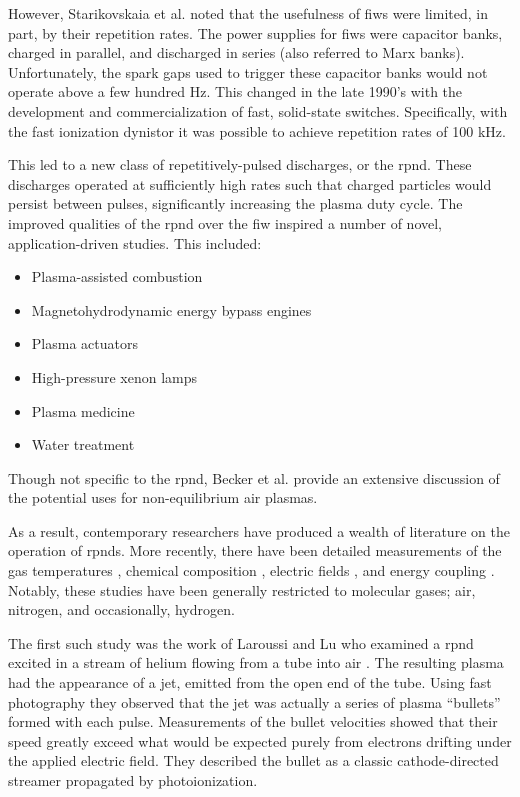 However, Starikovskaia et al. noted that the usefulness of \acs{fiw}s were
limited, in part, by their repetition rates. The power supplies for \acs{fiw}s
were capacitor banks, charged in parallel, and discharged in series (also
referred to Marx banks). Unfortunately, the spark gaps used to trigger these
capacitor banks would not operate above a few hundred Hz. This changed in the
late 1990's with the development and commercialization of fast, solid-state
switches. Specifically, with the fast ionization dynistor it was possible to
achieve repetition rates of 100 kHz.

This led to a new class of repetitively-pulsed discharges, or the \acs{rpnd}.
These discharges operated at sufficiently high rates such that charged particles
would persist between pulses, significantly increasing the plasma duty cycle.
The improved qualities of the \acs{rpnd} over the \acs{fiw} inspired a number of
novel, application-driven studies. This included:
\begin{itemize}
  \item Plasma-assisted combustion \cite{Pancheshnyi2006, Starikovskaia2006, 
        Adamovich2008}
  \item Magnetohydrodynamic energy bypass engines \cite{Macheret2002,
        Adamovich2008, Schneider2009a}
  \item Plasma actuators \cite{Starikovskii2009, Adamovich2009}
  \item High-pressure xenon lamps \cite{Nikandrov2008}
  \item Plasma medicine \cite{Ayan2009, Zimmermann2012}
  \item Water treatment \cite{Foster2013}
\end{itemize}
Though not specific to the \acs{rpnd}, Becker et al. \cite{Becker2005} provide
an extensive discussion of the potential uses for non-equilibrium air plasmas.

As a result, contemporary researchers have produced a wealth of literature on
the operation of \acs{rpnd}s. More recently, there have been detailed
measurements of the gas temperatures \cite{Pilla2006, Pancheshnyi2006,
Nishihara2006, Bao2007, Lou2007, Pai2009, Zuzeek2010, Nishihara2011}, chemical
composition \cite{Bao2007, Lou2007, Pai2009}, electric fields \cite{Ito2009,
Ito2010, Muller2011a}, and energy coupling \cite{Macheret2006, Pancheshnyi2006}.
Notably, these studies have been generally restricted to molecular gases; air,
nitrogen, and occasionally, hydrogen.

The first such study was the work of Laroussi and Lu who examined a \acs{rpnd}
excited in a stream of helium flowing from a tube into air \cite{Laroussi2005,
Lu2006}. The resulting plasma had the appearance of a jet, emitted from the open
end of the tube. Using fast photography they observed that the jet was actually
a series of plasma ``bullets'' formed with each pulse. Measurements of the
bullet velocities showed that their speed greatly exceed what would be expected
purely from electrons drifting under the applied electric field. They described
the bullet as a classic cathode-directed streamer propagated by photoionization.

